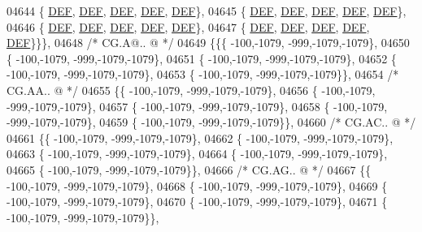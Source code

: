 \begin{DoxyCode}
04644 \{  \mbox{\hyperlink{1_88_84__epars_8h_a397419fc12b37ed479c8abb9d444d843}{DEF}},  \mbox{\hyperlink{1_88_84__epars_8h_a397419fc12b37ed479c8abb9d444d843}{DEF}},  \mbox{\hyperlink{1_88_84__epars_8h_a397419fc12b37ed479c8abb9d444d843}{DEF}},  \mbox{\hyperlink{1_88_84__epars_8h_a397419fc12b37ed479c8abb9d444d843}{DEF}},  \mbox{\hyperlink{1_88_84__epars_8h_a397419fc12b37ed479c8abb9d444d843}{DEF}}\},
04645 \{  \mbox{\hyperlink{1_88_84__epars_8h_a397419fc12b37ed479c8abb9d444d843}{DEF}},  \mbox{\hyperlink{1_88_84__epars_8h_a397419fc12b37ed479c8abb9d444d843}{DEF}},  \mbox{\hyperlink{1_88_84__epars_8h_a397419fc12b37ed479c8abb9d444d843}{DEF}},  \mbox{\hyperlink{1_88_84__epars_8h_a397419fc12b37ed479c8abb9d444d843}{DEF}},  \mbox{\hyperlink{1_88_84__epars_8h_a397419fc12b37ed479c8abb9d444d843}{DEF}}\},
04646 \{  \mbox{\hyperlink{1_88_84__epars_8h_a397419fc12b37ed479c8abb9d444d843}{DEF}},  \mbox{\hyperlink{1_88_84__epars_8h_a397419fc12b37ed479c8abb9d444d843}{DEF}},  \mbox{\hyperlink{1_88_84__epars_8h_a397419fc12b37ed479c8abb9d444d843}{DEF}},  \mbox{\hyperlink{1_88_84__epars_8h_a397419fc12b37ed479c8abb9d444d843}{DEF}},  \mbox{\hyperlink{1_88_84__epars_8h_a397419fc12b37ed479c8abb9d444d843}{DEF}}\},
04647 \{  \mbox{\hyperlink{1_88_84__epars_8h_a397419fc12b37ed479c8abb9d444d843}{DEF}},  \mbox{\hyperlink{1_88_84__epars_8h_a397419fc12b37ed479c8abb9d444d843}{DEF}},  \mbox{\hyperlink{1_88_84__epars_8h_a397419fc12b37ed479c8abb9d444d843}{DEF}},  \mbox{\hyperlink{1_88_84__epars_8h_a397419fc12b37ed479c8abb9d444d843}{DEF}},  \mbox{\hyperlink{1_88_84__epars_8h_a397419fc12b37ed479c8abb9d444d843}{DEF}}\}\}\},
04648 \textcolor{comment}{/* CG.A@.. @ */}
04649 \{\{\{ -100,-1079, -999,-1079,-1079\},
04650 \{ -100,-1079, -999,-1079,-1079\},
04651 \{ -100,-1079, -999,-1079,-1079\},
04652 \{ -100,-1079, -999,-1079,-1079\},
04653 \{ -100,-1079, -999,-1079,-1079\}\},
04654 \textcolor{comment}{/* CG.AA.. @ */}
04655 \{\{ -100,-1079, -999,-1079,-1079\},
04656 \{ -100,-1079, -999,-1079,-1079\},
04657 \{ -100,-1079, -999,-1079,-1079\},
04658 \{ -100,-1079, -999,-1079,-1079\},
04659 \{ -100,-1079, -999,-1079,-1079\}\},
04660 \textcolor{comment}{/* CG.AC.. @ */}
04661 \{\{ -100,-1079, -999,-1079,-1079\},
04662 \{ -100,-1079, -999,-1079,-1079\},
04663 \{ -100,-1079, -999,-1079,-1079\},
04664 \{ -100,-1079, -999,-1079,-1079\},
04665 \{ -100,-1079, -999,-1079,-1079\}\},
04666 \textcolor{comment}{/* CG.AG.. @ */}
04667 \{\{ -100,-1079, -999,-1079,-1079\},
04668 \{ -100,-1079, -999,-1079,-1079\},
04669 \{ -100,-1079, -999,-1079,-1079\},
04670 \{ -100,-1079, -999,-1079,-1079\},
04671 \{ -100,-1079, -999,-1079,-1079\}\},

\end{DoxyCode}
